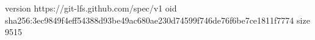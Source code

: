 version https://git-lfs.github.com/spec/v1
oid sha256:3ec9849f4eff54388d93be49ac680ae230d74599f746de76f6be7ce1811f7774
size 9515
